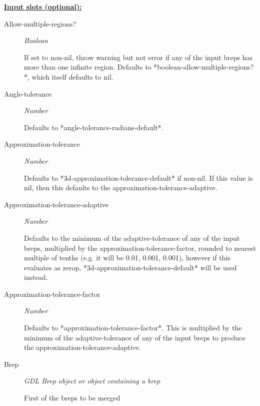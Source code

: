\documentclass [11pt]{book}
\begin{document}
\begin{itemize}
\textbf{
\underline{Input slots (optional):}}

\begin{description}

\item [Allow-multiple-regions?]
\emph{Boolean}

 If set to non-nil, throw warning but not error if any of the input breps has more than
one infinite region. Defaults to *boolean-allow-multiple-regions?*, which itself defaults to nil.




\item [Angle-tolerance]
\emph{Number}

 Defaults to *angle-tolerance-radians-default*.




\item [Approximation-tolerance]
\emph{Number}

 Defaults to *3d-approximation-tolerance-default* if non-nil. If this value is nil,
then this defaults to the approximation-tolerance-adaptive.




\item [Approximation-tolerance-adaptive]
\emph{Number}

 Defaults to the minimum of the adaptive-tolerance of any of the input breps,
multiplied by the approximation-tolerance-factor, rounded to nearest multiple of
tenths (e.g. it will be 0.01, 0.001, 0.001), however if this evaluates as zerop,
*3d-approximation-tolerance-default* will be used instead.




\item [Approximation-tolerance-factor]
\emph{Number}

 Defaults to *approximation-tolerance-factor*. This is multiplied by  the minimum of the
adaptive-tolerance of any of the input breps to produce the approximation-tolerance-adaptive.




\item [Brep]
\emph{GDL Brep object or object containing a brep}

 First of the breps to be merged





\end{description}
\end{itemize}
\end{document}
